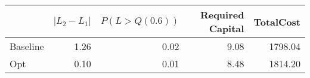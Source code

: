 \begin{tabular}{lrrrr}
\toprule
{} &  $|L_2 - L_1|$ &  $P(L > Q(0.6))$ &  Required Capital &  TotalCost \\
\midrule
Baseline &       1.26 &             0.02 &              9.08 &    1798.04 \\
Opt      &       0.10 &             0.01 &              8.48 &    1814.20 \\
\bottomrule
\end{tabular}
